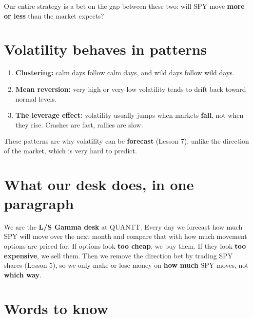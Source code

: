 \documentclass{article}
\begin{document}
Our entire strategy is a bet on the gap between these two: will SPY move \textbf{more or less} than the market expects?

\section{Volatility behaves in patterns}

\begin{enumerate}

\item \textbf{Clustering:} calm days follow calm days, and wild days follow wild days.

\item \textbf{Mean reversion:} very high or very low volatility tends to drift back toward normal levels.

\item \textbf{The leverage effect:} volatility usually jumps when markets \textbf{fall}, not when they rise. Crashes are fast, rallies are slow.

\end{enumerate}

These patterns are why volatility can be \textbf{forecast} (Lesson 7), unlike the direction of the market, which is very hard to predict.

\section{What our desk does, in one paragraph}

We are the \textbf{L/\allowbreak{}S Gamma desk} at QUANTT. Every day we forecast how much SPY will move over the next month and compare that with how much movement options are priced for. If options look \textbf{too cheap}, we buy them. If they look \textbf{too expensive}, we sell them. Then we remove the direction bet by trading SPY shares (Lesson 5), so we only make or lose money on \textbf{how much} SPY moves, not \textbf{which way}.

\section{Words to know}
\end{document}

